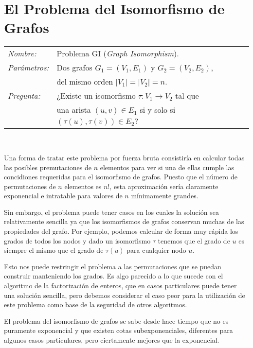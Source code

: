 \section{El Problema del Isomorfismo de Grafos}

\hfil

\begin{tabular}{|ll}\label{problemaGI}\index{Problema Isomorfismo de Grafos}\index{GI}
	\textit{Nombre:} & Problema GI ({\em Graph Isomorphism}). \\
	\textit{Parámetros:} & Dos grafos $G_1 = (V_1, E_1)$ y $G_2 = (V_2, E_2)$,
	\\ & del mismo orden $\mid V_1 \mid = \mid V_2 \mid = n$. \\
	\textit{Pregunta:} & ¿Existe un isomorfismo $\tau : V_1 \rightarrow V_2$
	tal que \\ & una arista $(u,v)\in E_1$ si y solo si $(\tau (u),\tau (v))
	\in E_2$? \\
\end{tabular}
\\

\hfil

Una forma de tratar este problema por fuerza bruta consistir\'ia en calcular
todas las posibles premutaciones de $n$ elementos para ver si una de ellas
cumple las concidiones requeridas para el isomorfismo de grafos. Puesto que el
n\'umero de permutaciones de $n$ elementos es $n!$, esta aproximaci\'on ser\'ia
claramente exponencial e intratable para valores de $n$ m\'inimamente grandes.

Sin embargo, el problema puede tener casos en los cuales la soluci\'on sea
relativamente sencilla ya que los isomorfismos de grafos conservan muchas de las
propiedades del grafo. Por ejemplo, podemos calcular de forma muy r\'apida los
grados de todos los nodos y dado un isomorfismo $\tau$ tenemos que el grado de
$u$ es siempre el mismo que el grado de $\tau(u)$ para cualquier nodo $u$.

Esto nos puede restringir el problema a las permutaciones que se puedan construir
manteniendo los grados. Es algo parecido a lo que sucede con el algoritmo de la factorizaci\'on de enteros,
que en casos particulares puede tener una soluci\'on sencilla, pero debemos considerar
el caso peor para la utilizaci\'on de este problema como base de la seguridad de otros algoritmos.

El problema del isomorfismo de grafos se sabe desde hace tiempo que no es puramente
exponencial y que existen cotas subexponenciales, diferentes para algunos casos particulares,
pero ciertamente mejores que la exponencial.

